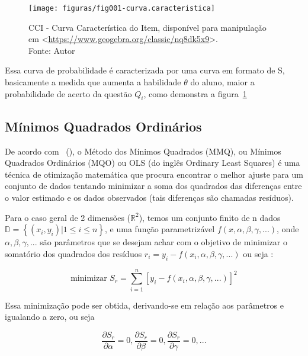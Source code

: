\documentclass[
	article,			%
	11pt,				%
	oneside,			%
	a4paper,			%
	english,			%
	brazil,				%
	sumario=tradicional
]{abntex2}
\newcommand{\citeaa}[1]{\citeauthoronline{#1}~(\citeyear{#1})}
\begin{document}
\begin{enumerate}[label=\alph*)]
					\begin{figure}[htb]
						\centering
						\texttt{[image: figuras/fig001-curva.caracteristica]}
						\caption[CCI - Curva Característica do Item]{CCI - Curva Característica do Item, disponível para manipulação em <\href{https://www.geogebra.org/classic/nq8dk5x9}{https://www.geogebra.org/classic/nq8dk5x9}>. \\
							Fonte: Autor}
						\label{fig:fig01-tri}
					\end{figure}
					
					Essa curva de probabilidade é caracterizada por uma curva em formato de S, basicamente a medida que aumenta a habilidade $\theta$ do aluno, maior a probabilidade de acerto da questão $Q_i$, como demonstra a figura~\ref{fig:fig01-tri}  
					
				
				\end{enumerate}
			
										
		\subsection{Mínimos Quadrados Ordinários}
			De acordo com \citeaa{WikipediaMMQ2021}, o Método dos Mínimos Quadrados (MMQ), ou Mínimos Quadrados Ordinários (MQO) ou OLS (do inglês Ordinary Least Squares) é uma técnica de otimização matemática que procura encontrar o melhor ajuste para um conjunto de dados tentando minimizar a soma dos quadrados das diferenças entre o valor estimado e os dados observados (tais diferenças são chamadas resíduos).
			
			Para o caso geral de 2 dimensões ($ \mathbb{R}^2 $), temos um conjunto finito de n dados $ \mathbb{D} = \left\lbrace (x_i,y_i) | 1 \leqslant i \leqslant n \right\rbrace $, e uma função parametrizável $ f(x, \alpha, \beta, \gamma, ...) $, onde $ \alpha, \beta, \gamma, ... $ são parâmetros que se desejam achar com o objetivo de minimizar o somatório dos quadrados dos resíduos $r_i = y_i - f(x_ i, \alpha, \beta, \gamma, ...) $ ou seja :
			
			\[ \text{minimizar  } S_r = \sum_{i=1}^n \left[ y_ i - f(x_ i, \alpha, \beta, \gamma, ...) \right]^2  \]
			
			Essa minimização pode ser obtida, derivando-se em relação aos parâmetros e igualando a zero, ou seja
			
			\[ \dfrac{\partial S_r}{\partial \alpha} = 0 , \dfrac{\partial S_r}{\partial \beta} = 0 , \dfrac{\partial S_r}{\partial \gamma} = 0 , ... \]
			
\end{document}
